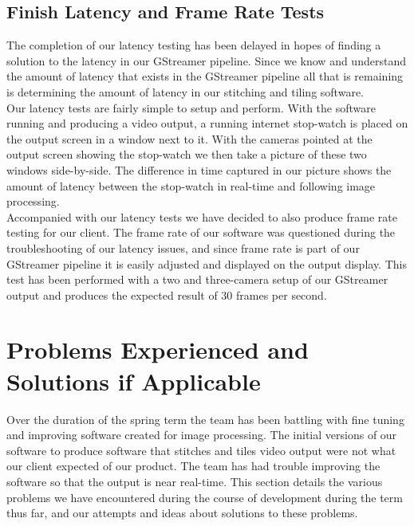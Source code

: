 \documentclass[letterpaper,10pt,serif,draftclsnofoot,onecolumn,compsoc,titlepage]{IEEEtran}
\begin{document}
\subsection{Finish Latency and Frame Rate Tests}

The completion of our latency testing has been delayed in hopes of finding a solution to 
the latency in our GStreamer pipeline. Since we know and understand the amount of latency 
that exists in the GStreamer pipeline all that is remaining is determining the amount of 
latency in our stitching and tiling software. \\

Our latency tests are fairly simple to setup and perform. With the software running and 
producing a video output, a running internet stop-watch is placed on the output screen 
in a window 
next to it. With the cameras pointed at the output screen showing the stop-watch we then 
take a picture of these two windows side-by-side. The difference in time captured in our 
picture shows the amount of latency between the stop-watch in real-time and following 
image processing. \\

Accompanied with our latency tests we have decided to also produce frame rate testing for 
our client. The frame rate of our software was questioned during the troubleshooting of 
our latency issues, and since frame rate is part of our GStreamer pipeline it is easily 
adjusted and displayed on the output display. This test has been performed with a two and 
three-camera setup of our GStreamer output and produces the expected result of 30 frames 
per second.  \\

\section{Problems Experienced and Solutions if Applicable}

Over the duration of the spring term the team has been battling with fine tuning and 
improving software created for image processing. The initial versions of our software to 
produce software that stitches and tiles video output were not what our client expected 
of our product. The team has had trouble improving the software so that the output is 
near real-time. This section details the various problems we have encountered during 
the course of development during the term thus far, and our attempts and ideas about 
solutions to these problems.
\end{document}
